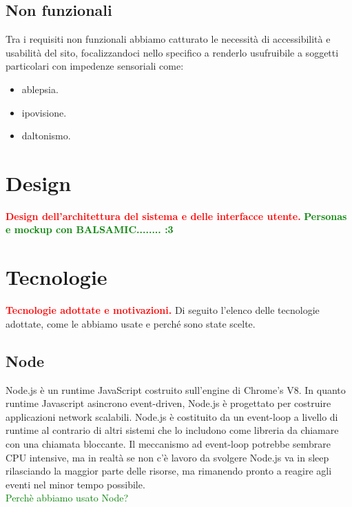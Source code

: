 \documentclass{article}
\begin{document}
\subsection{Non funzionali}
Tra i requisiti non funzionali abbiamo catturato le necessità di accessibilità e usabilità del sito, focalizzandoci nello specifico a renderlo usufruibile a soggetti particolari con impedenze sensoriali come:
\begin{itemize}
	\item ablepsia.
	\item ipovisione.
	\item daltonismo.
\end{itemize}

\section{Design}
\textcolor{red}{\textbf{Design dell'architettura del sistema e delle interfacce utente.}}
\textcolor{green}{\textbf{Personas e mockup con BALSAMIC........ :3}}

\section{Tecnologie}
\textcolor{red}{\textbf{Tecnologie adottate e motivazioni.}}
Di seguito l'elenco delle tecnologie adottate, come le abbiamo usate e perché sono state scelte.
\subsection{Node}
Node.js\cite{node} è un runtime JavaScript costruito sull'engine di Chrome's V8.
In quanto runtime Javascript asincrono event-driven, Node.js è progettato per costruire applicazioni network scalabili. Node.js è costituito da un event-loop a livello di runtime al contrario di altri sistemi che lo includono come libreria da chiamare con una chiamata bloccante. Il meccanismo ad event-loop potrebbe sembrare CPU intensive, ma in realtà se non c'è lavoro da svolgere Node.js va in sleep rilasciando la maggior parte delle risorse, ma rimanendo pronto a reagire agli eventi nel minor tempo possibile.
\\
\textcolor{green}{Perchè abbiamo usato Node?}
\end{document}

